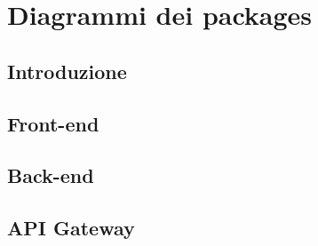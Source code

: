 \newpage
\section{Diagrammi dei packages}

\subsection{Introduzione}

\subsection{Front-end}

\subsection{Back-end}

\subsection{API Gateway}